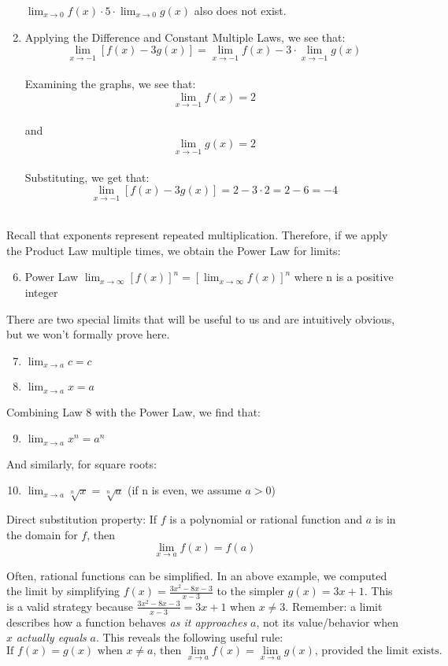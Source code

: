 \begin{Answer}
\begin{enumerate}
        $\lim_{x\to0}f(x) \cdot 5 \cdot \lim_{x\to0}g(x)$ also does not exist. 
        \item Applying the Difference and Constant Multiple Laws, we see that: 
        $$\lim_{x\to-1} \left[f(x) - 3g(x)\right] =\lim_{x\to-1}f(x) - 3 \cdot \lim_{x\to-1}g(x)$$ \\
        Examining the graphs, we see that: 
        $$\lim_{x\to-1}f(x) = 2$$\\ 
        and 
        $$\lim_{x\to-1}g(x) = 2$$\\ 
        Substituting, we get that: 
        $$\lim_{x\to-1} \left[f(x) - 3g(x)\right] =2 - 3 \cdot 2 = 2-6 = -4$$\\
    \end{enumerate}
\end{Answer}


Recall that exponents represent repeated multiplication. Therefore, if we apply the 
Product Law multiple times, we obtain the Power Law for limits:
\begin{enumerate}
    \setcounter{enumi}{5}
    \item Power Law $\lim_{x \to \infty} \left[ f(x) \right]^n = \left[ 
    \lim_{x \to \infty} f(x) \right]^n$ where n is a positive integer
\end{enumerate}
There are two special limits that will be useful to us and are intuitively 
obvious, but we won't formally prove here.  
\begin{enumerate}
    \setcounter{enumi}{6}
    \item $\lim_{x\to a} \textit{c} = \textit{c}$
    \item $\lim_{x\to a} x = a$
\end{enumerate}
Combining Law 8 with the Power Law, we find that:
\begin{enumerate}
\setcounter{enumi}{8}
    \item $\lim_{x\to a} x^n = a^n$
\end{enumerate}
And similarly, for square roots:
\begin{enumerate}
    \setcounter{enumi}{9}
    \item $\lim_{x\to a} \sqrt[n]{x} = \sqrt[n]{a}$ (if n is even, we assume $a > 0$)
\end{enumerate}

Direct substitution property: If $f$ is a polynomial or rational function and $a$ 
is in the domain for $f$, then $$\lim_{x \to a}f(x) = f(a)$$

Often, rational functions can be simplified. In an above example, we computed the 
limit by simplifying $f(x) = \frac{3x^2-8x-3}{x-3}$ to the simpler $g(x) = 3x+1$. 
This is a valid strategy because $\frac{3x^2-8x-3}{x-3} = 3x+1$ when $x \neq 3$. 
Remember: a limit describes how a function behaves \textit{as it approaches} $a$, 
not its value/behavior when $x$ \textit{actually equals} $a$. This reveals the 
following useful rule: 
$$\text{If } f(x)=g(x) \text{ when } x \neq a \text{, then } 
\lim_{x \to a}f(x) = \lim_{x \to a}g(x) \text{, provided the limit exists.}$$

